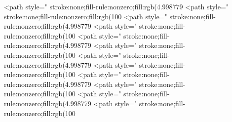 <path style=" stroke:none;fill-rule:nonzero;fill:rgb(4.998779%
<path style=" stroke:none;fill-rule:nonzero;fill:rgb(100%
<path style=" stroke:none;fill-rule:nonzero;fill:rgb(4.998779%
<path style=" stroke:none;fill-rule:nonzero;fill:rgb(100%
<path style=" stroke:none;fill-rule:nonzero;fill:rgb(4.998779%
<path style=" stroke:none;fill-rule:nonzero;fill:rgb(100%
<path style=" stroke:none;fill-rule:nonzero;fill:rgb(4.998779%
<path style=" stroke:none;fill-rule:nonzero;fill:rgb(100%
<path style=" stroke:none;fill-rule:nonzero;fill:rgb(4.998779%
<path style=" stroke:none;fill-rule:nonzero;fill:rgb(100%
<path style=" stroke:none;fill-rule:nonzero;fill:rgb(4.998779%
<path style=" stroke:none;fill-rule:nonzero;fill:rgb(100%
